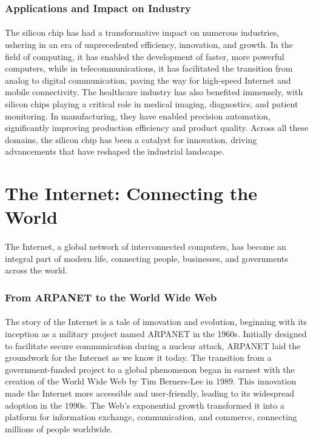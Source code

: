 \documentclass{book}
\begin{document}
\subsubsection*{Applications and Impact on Industry}
\paragraph{}
The silicon chip has had a transformative impact on numerous industries, ushering in an era of unprecedented efficiency, innovation, and growth. In the field of computing, it has enabled the development of faster, more powerful computers, while in telecommunications, it has facilitated the transition from analog to digital communication, paving the way for high-speed Internet and mobile connectivity. The healthcare industry has also benefited immensely, with silicon chips playing a critical role in medical imaging, diagnostics, and patient monitoring. In manufacturing, they have enabled precision automation, significantly improving production efficiency and product quality. Across all these domains, the silicon chip has been a catalyst for innovation, driving advancements that have reshaped the industrial landscape.

\section*{The Internet: Connecting the World}
\paragraph{}
The Internet, a global network of interconnected computers, has become an integral part of modern life, connecting people, businesses, and governments across the world.

\subsubsection*{From ARPANET to the World Wide Web}
\paragraph{}
The story of the Internet is a tale of innovation and evolution, beginning with its inception as a military project named ARPANET in the 1960s. Initially designed to facilitate secure communication during a nuclear attack, ARPANET laid the groundwork for the Internet as we know it today. The transition from a government-funded project to a global phenomenon began in earnest with the creation of the World Wide Web by Tim Berners-Lee in 1989. This innovation made the Internet more accessible and user-friendly, leading to its widespread adoption in the 1990s. The Web's exponential growth transformed it into a platform for information exchange, communication, and commerce, connecting millions of people worldwide.
\end{document}
